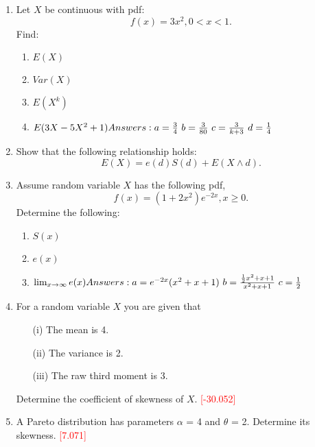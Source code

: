\documentclass[11pt]{article}
\begin{document}
    \begin{enumerate}
        \item Let $X$ be continuous with pdf:
        \[f(x) = 3x^2, 0 < x < 1.\]
        Find:
        \begin{enumerate}
            \item $E(X)$ 
            \item $Var(X)$
            \item $E(X^k)$
            \item $E(3X - 5X^2 + 1)\\\\
            Answers: a=\frac{3}{4}\,\, b=\frac{3}{80} \,\, c=\frac{3}{k+3} \,\, d=\frac{1}{4} $
        \end{enumerate}
        \item Show that the following relationship holds:
        \[E(X)=e(d)S(d) + E(X \wedge d).\]
        \item Assume random variable $X$ has the following pdf,
        \[f(x) = (1 + 2x^2)e^{-2x}, x \geq 0.\]
        Determine the following:
            \begin{enumerate}
                \item $S(x)$
                \item $e(x)$
                \item $\lim_{x\rightarrow \infty}e(x) \\\\ %
                Answers: a=e^{-2x}(x^2+x+1) 
                \,\, b=\frac{\frac{1}{2}x^2 + x + 1}{x^2 + x + 1} \,\, c= \frac{1}{2} $
            \end{enumerate}
	\item For a random variable $X$ you are given that 
	\begin{enumerate} 
	   \item[(i)] The mean is 4.
            \item[(ii)]The variance is 2. 
            \item[(iii)] The raw third moment is 3. 
        \end{enumerate}
	 Determine the coefficient of skewness of $X$. \textcolor{red}{[-30.052]}
	\item A Pareto distribution has parameters $\alpha$ = 4 and $\theta$ = 2. Determine its skewness. \textcolor{red}{[7.071]}

\end{enumerate}
\end{document}
